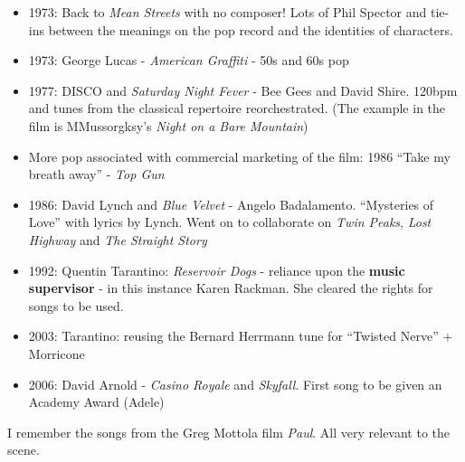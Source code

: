 \begin{itemize}
\item 1973: Back to \textit{Mean Streets} with no composer! Lots of Phil Spector and tie-ins between the meanings on the pop record and the identities of characters.
\item 1973: George Lucas - \textit{American Graffiti} - 50s and 60s pop
\item 1977: DISCO and \textit{Saturday Night Fever} - Bee Gees and David Shire. 120bpm and tunes from the classical repertoire reorchestrated. (The example in the film is MMussorgksy's \textit{Night on a Bare Mountain})
\item More pop associated with commercial marketing of the film: 1986 ``Take my breath away'' - \textit{Top Gun}
\item 1986: David Lynch and \textit{Blue Velvet} - Angelo Badalamento. ``Mysteries of Love'' with lyrics by Lynch. Went on to collaborate on \textit{Twin Peaks}, \textit{Lost Highway} and \textit{The Straight Story}
\item 1992: Quentin Tarantino: \textit{Reservoir Dogs} - reliance upon the \textbf{music supervisor} - in this instance Karen Rackman. She cleared the rights for songs to be used.
\item 2003: Tarantino: reusing the Bernard Herrmann tune for ``Twisted Nerve'' + Morricone
\item 2006: David Arnold - \textit{Casino Royale} and \textit{Skyfall}. First song to be given an Academy Award (Adele)
 \end{itemize}

I remember the songs from the Greg Mottola film \textit{Paul}. All very relevant to the scene.

